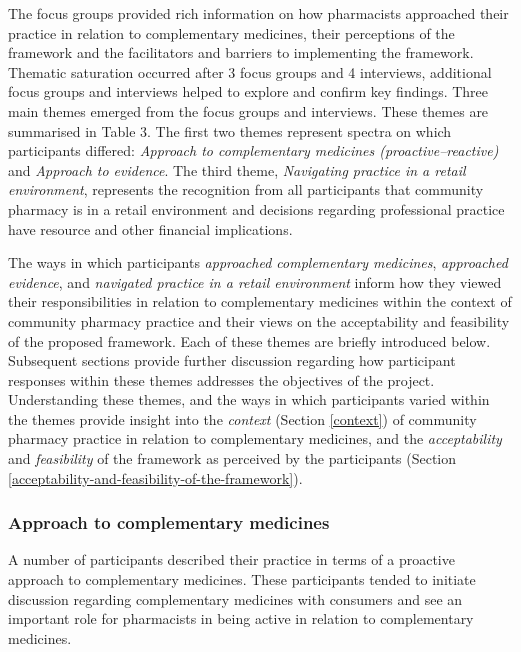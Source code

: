 \documentclass[11pt,a4paper]{article}
\begin{document}
The focus groups provided rich information on how pharmacists approached
their practice in relation to complementary medicines, their perceptions
of the framework and the facilitators and barriers to implementing the
framework. Thematic saturation occurred after 3 focus groups and 4
interviews, additional focus groups and interviews helped to explore and
confirm key findings. Three main themes emerged from the focus groups
and interviews. These themes are summarised in Table 3. The first two
themes represent spectra on which participants differed: \emph{Approach
to complementary medicines (proactive--reactive)} and \emph{Approach to
evidence}. The third theme, \emph{Navigating practice in a retail
environment}, represents the recognition from all participants that
community pharmacy is in a retail environment and decisions regarding
professional practice have resource and other financial implications.



The ways in which participants \emph{approached complementary
medicines}, \emph{approached evidence}, and \emph{navigated practice in
a retail environment} inform how they viewed their responsibilities in
relation to complementary medicines within the context of community
pharmacy practice and their views on the acceptability and feasibility
of the proposed framework. Each of these themes are briefly introduced
below. Subsequent sections provide further discussion regarding how
participant responses within these themes addresses the objectives of
the project. Understanding these themes, and the ways in which
participants varied within the themes provide insight into the
\emph{context} (Section \ref{context}) of community pharmacy practice in
relation to complementary medicines, and the \emph{acceptability} and
\emph{feasibility} of the framework as perceived by the participants
(Section \ref{acceptability-and-feasibility-of-the-framework}).

\subsubsection{Approach to complementary
medicines}\label{approach-to-complementary-medicines}

A number of participants described their practice in terms of a
proactive approach to complementary medicines. These participants tended
to initiate discussion regarding complementary medicines with consumers
and see an important role for pharmacists in being active in relation to
complementary medicines.
\end{document}
